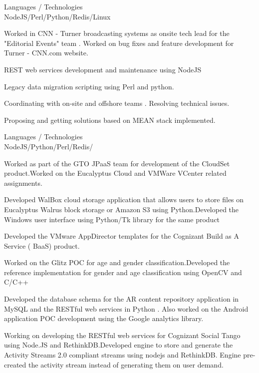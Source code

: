 \documentclass[a4,11pt]{cv4tw}
\begin{document}
{Languages / Technologies \\ NodeJS/Perl/Python/Redis/Linux}
	{ 
	\begin{missions}
		\item Worked in CNN - Turner broadcasting systems as onsite tech lead for the "Editorial Events" team . Worked on bug fixes and feature development for Turner - CNN.com website.
		\item REST web services development and maintenance using NodeJS
		\item Legacy data migration scripting using Perl and python.
		\item Coordinating with on-site and offshore teams . Resolving technical issues.
		\item Proposing and getting solutions based on MEAN stack implemented.
	\end{missions}
}

{Languages / Technologies \\ NodeJS/Python/Perl/Redis/}
	{ 
	\begin{missions}
		\item Worked as part of the GTO JPaaS team for development of the CloudSet product.Worked on the Eucalyptus Cloud and VMWare VCenter related assignments.
		\item Developed WalBox cloud storage application that allows users to store files on Eucalyptus Walrus block storage or Amazon S3 using Python.Developed the Windows user interface using Python/Tk library for the same product
		\item Developed the VMware AppDirector templates for the Cognizant Build as A Service ( BaaS) product.
		\item Worked on the Glitz POC for age and gender classification.Developed the reference implementation for gender and age classification using OpenCV and C/C++
		\item Developed the database schema for the AR content repository application in MySQL and the RESTful web services in Python . Also worked on the Android application POC development using the Google analytics library.
		\item Working on  developing the RESTful web services for Cognizant Social Tango using Node.JS and RethinkDB.Developed engine to store and generate the Activity Streams 2.0 compliant streams using nodejs and RethinkDB. Engine pre-created the activity stream instead of generating them on user demand.
	\end{missions}
}
\end{document}
